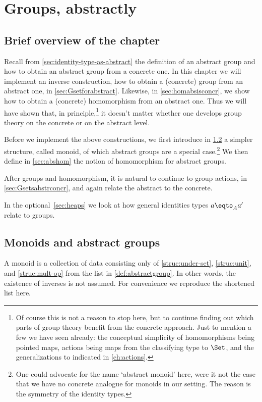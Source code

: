 \chapter{Groups, abstractly}
\label{ch:absgroup}

\section{Brief overview of the chapter}
Recall from \cref{sec:identity-type-as-abstract} the definition of an 
abstract group and how to obtain an abstract group from a concrete one. 
In this chapter we will 
implement an inverse construction, how to obtain a (concrete) group from
an abstract one, in \cref{sec:Gsetforabstract}. Likewise, in \cref{sec:homabsisconcr},
we show how to obtain a (concrete) homomorphism from an abstract one.
Thus we will have shown that, in principle,\footnote{%
Of course this is not a reason to stop here, but to continue
finding out which parts of group theory benefit from the concrete approach.
Just to mention a few we have seen already: 
the conceptual simplicity of homomorphisms being pointed maps,
actions being maps from the classifying type to $\Set$, 
and the generalizations to \inftygps indicated in \cref{ch:actions}.}
it doesn't matter whether
one develops group theory on the concrete or on the abstract level.

Before we implement the above constructions, 
we first introduce in \cref{sec:monoids} a simpler structure, 
called monoid, of which abstract groups are a special case.\footnote{%
One could advocate for the name `abstract monoid' here, were it not the
case that we have no concrete analogue for monoids in our setting.
The reason is the symmetry of the identity types.}
We then define in \cref{sec:abshom} the notion of homomorphism for
abstract groups.

After groups and homomorphism, it is natural to continue to group actions,
in \cref{sec:Gsetsabstrconcr}, and again relate the abstract to the concrete.

 In the optional~\cref{sec:heaps} we look at how general
identities types $a \eqto_A a'$ relate to groups.

\section{Monoids and abstract groups}
\label{sec:monoids}

  A monoid is a collection of data consisting only of \ref{struc:under-set}, 
  \ref{struc:unit}, and \ref{struc:mult-op} from the list in
  \cref{def:abstractgroup}.
  In other words, the existence of inverses is not assumed.
  For convenience we reproduce the shortened list here.

